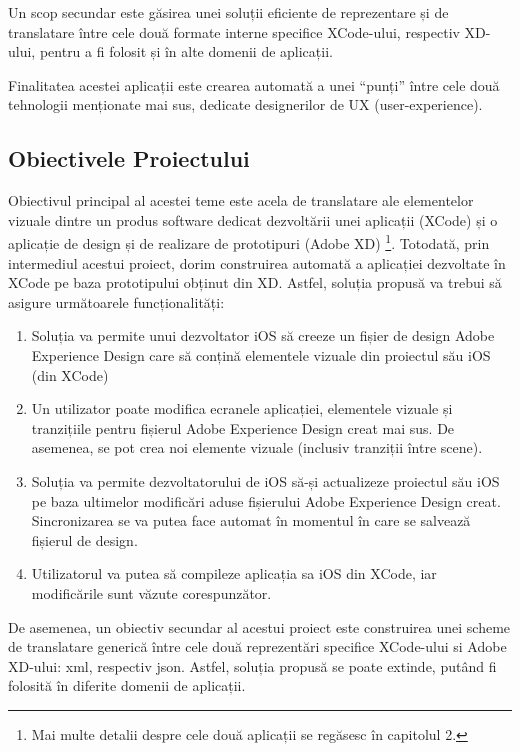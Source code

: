 Un scop secundar este găsirea unei soluții eficiente de reprezentare și de translatare între cele două formate interne specifice XCode-ului, respectiv XD-ului, pentru a fi folosit și în alte domenii de aplicații.

Finalitatea acestei aplicații este crearea automată  a unei “punți” între cele două tehnologii menționate mai sus, dedicate designerilor de UX (user-experience).

\subsection{Obiectivele Proiectului}
\label{sub-sec:proj-objectives}

Obiectivul principal al acestei teme este acela de translatare ale elementelor vizuale dintre un produs software dedicat dezvoltării unei aplicații (XCode) și o aplicație de design și de realizare de prototipuri (Adobe XD) \footnote{Mai multe detalii despre cele două aplicații se regăsesc în capitolul 2.}. Totodată, prin intermediul acestui proiect, dorim construirea automată a aplicației dezvoltate în XCode pe baza prototipului obținut din XD.
Astfel, soluția propusă va trebui să asigure următoarele funcționalități:

\begin{enumerate}
\item Soluția va permite unui dezvoltator iOS să creeze un fișier de design Adobe Experience Design care să conțină elementele vizuale din proiectul său iOS (din XCode)
\item Un utilizator poate modifica ecranele aplicației, elementele vizuale și tranzițiile pentru fișierul Adobe Experience Design creat mai sus. De asemenea, se pot crea noi elemente vizuale (inclusiv tranziții între scene).
\item Soluția va permite dezvoltatorului de iOS să-și actualizeze proiectul său iOS pe baza ultimelor modificări aduse fișierului Adobe Experience Design creat. Sincronizarea se va putea face automat în momentul în care se salvează fișierul de design. 
\item  Utilizatorul va putea să compileze aplicația sa iOS din XCode, iar modificările sunt văzute corespunzător. 
\end{enumerate}

De asemenea, un obiectiv secundar al acestui proiect este construirea unei scheme de translatare generică între cele două reprezentări specifice XCode-ului si Adobe XD-ului: xml, respectiv json.
Astfel, soluția propusă se poate extinde, putând fi folosită în diferite domenii de aplicații.


